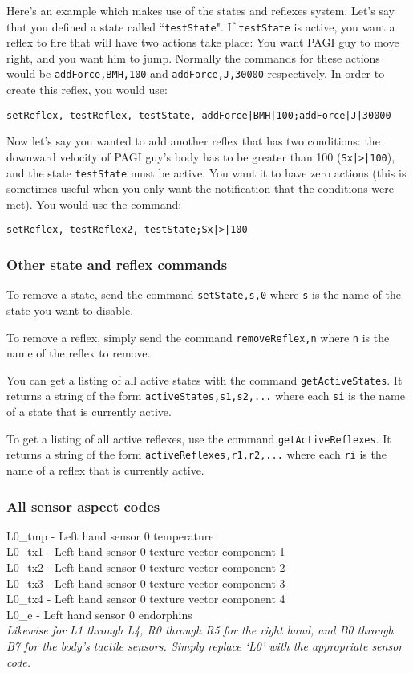 Here's an example which makes use of the states and reflexes system. Let's say that you defined a state called ``\texttt{testState}". If \texttt{testState} is active, you want a reflex to fire that will have two actions take place: You want PAGI guy to move right, and you want him to jump. Normally the commands for these actions would be \texttt{addForce,BMH,100} and \texttt{addForce,J,30000} respectively. In order to create this reflex, you would use:

\noindent \texttt{setReflex, testReflex, testState, addForce|BMH|100;addForce|J|30000}

Now let's say you wanted to add another reflex that has two conditions: the downward velocity of PAGI guy's body has to be greater than 100 (\texttt{Sx|>|100}), and the state \texttt{testState} must be active. You want it to have zero actions (this is sometimes useful when you only want the notification that the conditions were met). You would use the command:

\noindent \texttt{setReflex, testReflex2, testState;Sx|>|100 }

\subsubsection{Other state and reflex commands}

To remove a state, send the command \texttt{setState,s,0} where \texttt{s} is the name of the state you want to disable.

To remove a reflex, simply send the command \texttt{removeReflex,n} where \texttt{n} is the name of the reflex to remove.

You can get a listing of all active states with the command \texttt{getActiveStates}. It returns a string of the form \texttt{activeStates,s1,s2,...} where each \texttt{si} is the name of a state that is currently active. 

To get a listing of all active reflexes, use the command \texttt{getActiveReflexes}. It returns a string of the form \texttt{activeReflexes,r1,r2,...} where each \texttt{ri} is the name of a reflex that is currently active.

\subsubsection{All sensor aspect codes}
\label{sect:sensorAspectCodes}

L0\_tmp - Left hand sensor 0 temperature\\
L0\_tx1 - Left hand sensor 0 texture vector component 1\\
L0\_tx2 - Left hand sensor 0 texture vector component 2\\
L0\_tx3 - Left hand sensor 0 texture vector component 3\\
L0\_tx4 - Left hand sensor 0 texture vector component 4\\
L0\_e - Left hand sensor 0 endorphins\\
\textit{Likewise for L1 through L4, R0 through R5 for the right hand, and B0 through B7 for the body's tactile sensors. Simply replace `L0' with the appropriate sensor code.}

